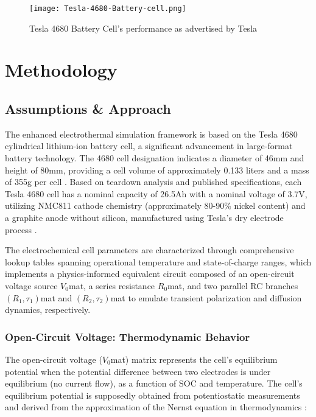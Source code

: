 \documentclass[conference]{IEEEtran}
\begin{document}
\begin{figure}[H]
    \centering
    \texttt{[image: Tesla-4680-Battery-cell.png]}
    \caption{Tesla 4680 Battery Cell's performance as advertised by Tesla \cite{lambert2023tesla}}
    \label{fig:enter-label}
\end{figure}



\section{\textbf{Methodology}}

\subsection{\textbf{Assumptions \& Approach}}
The enhanced electrothermal simulation framework is based on the Tesla 4680 cylindrical lithium-ion battery cell, a significant advancement in large-format battery technology. The 4680 cell designation indicates a diameter of 46mm and height of 80mm, providing a cell volume of approximately 0.133 liters and a mass of 355g per cell \cite{ALLGAUER2025117318}. Based on teardown analysis and published specifications, each Tesla 4680 cell has a nominal capacity of 26.5Ah with a nominal voltage of 3.7V, utilizing NMC811 cathode chemistry (approximately 80-90\% nickel content) and a graphite anode without silicon, manufactured using Tesla's dry electrode process \cite{nigel2022tesla} \cite{ank2023lithium}. 

The electrochemical cell parameters are characterized through comprehensive lookup tables spanning operational temperature and state-of-charge ranges, which implements a physics-informed equivalent circuit composed of an open-circuit voltage source $V_0$mat, a series resistance $R_0$mat, and two parallel RC branches $(R_1,\tau_1)$mat and $(R_2,\tau_2)$mat to emulate transient polarization and diffusion dynamics, respectively. 


\subsubsection{\textbf{Open-Circuit Voltage: Thermodynamic Behavior}}

The open-circuit voltage ($V_0$mat) matrix represents the cell's equilibrium potential when the potential difference between two electrodes is under equilibrium (no current flow), as a function of SOC and temperature. The cell's equilibrium potential is supposedly obtained from potentiostatic measurements and derived from the approximation of the Nernst equation in thermodynamics \cite{mit2014equilibrium}:
\end{document}
